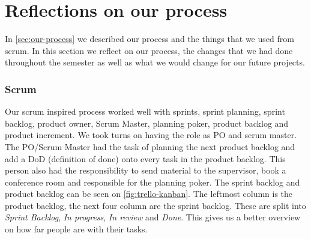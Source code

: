 \section{Reflections on our process}
In \autoref{sec:our-process} we described our process and the things that we used from scrum.
In this section we reflect on our process, the changes that we had done throughout the semester as well as what we would change for our future projects.

\subsubsection{Scrum}
Our scrum inspired process worked well with sprints, sprint planning, sprint backlog, product owner, Scrum Master, planning poker, product backlog and product increment.
We took turns on having the role as PO and scrum master.
The PO/Scrum Master had the task of planning the next product backlog and add a DoD (definition of done) onto every task in the product backlog.
This person also had the responsibility to send material to the supervisor, book a conference room and responsible for the planning poker.
The sprint backlog and product backlog can be seen on \autoref{fig:trello-kanban}. 
The leftmost column is the product backlog, the next four column are the sprint backlog.
These are split into \textit{Sprint Backlog}, \textit{In progress}, \textit{In review} and \textit{Done}.
This gives us a better overview on how far people are with their tasks.

